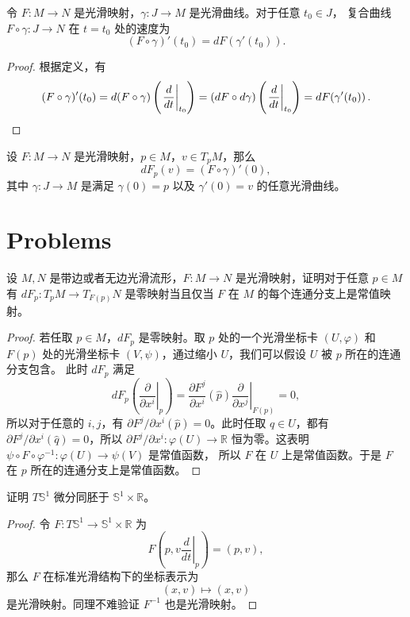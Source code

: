 \documentclass[fontset=none]{Notes}
\begin{document}
\begin{proposition}[复合曲线的速度]
  令 $F:M\to N$ 是光滑映射，$\gamma:J\to M$ 是光滑曲线。对于任意 $t_0\in J$，
  复合曲线 $F\circ\gamma:J\to N$ 在 $t=t_0$ 处的速度为
  \[
    (F\circ\gamma)'(t_0)=dF\!\left(\gamma'(t_0)\right)  .
  \]
\end{proposition}
\begin{proof}
  根据定义，有
  \[
    (F\circ\gamma)'(t_0)=d(F\circ\gamma)\left(
      \left.\frac{d}{dt}\right|_{t_0}
    \right)=(dF\circ d\gamma)\left(
      \left.\frac{d}{dt}\right|_{t_0}
    \right)=dF\!\left(\gamma'(t_0)\right).\qedhere
  \]
\end{proof}

\begin{corollary}[通过速度向量计算微分]
  设 $F:M\to N$ 是光滑映射，$p\in M$，$v\in T_pM$，那么
  \[
    dF_p(v)=(F\circ\gamma)'(0),  
  \]
  其中 $\gamma:J\to M$ 是满足 $\gamma(0)=p$ 以及 $\gamma'(0)=v$ 的任意光滑曲线。
\end{corollary}

\section{Problems}

\begin{problem}{}{}
  设 $M,N$ 是带边或者无边光滑流形，$F:M\to N$ 是光滑映射，证明对于任意 $p\in M$
  有 $dF_p:T_pM\to T_{F(p)}N$ 是零映射当且仅当 $F$ 在 $M$ 的每个连通分支上是常值映射。
\end{problem}
\begin{proof}
  若任取 $p\in M$，$dF_p$ 是零映射。取 $p$ 处的一个光滑坐标卡 $(U,\varphi)$ 和
  $F(p)$ 处的光滑坐标卡 $(V,\psi)$，通过缩小 $U$，我们可以假设 $U$ 被 $p$ 所在的连通分支包含。
  此时 $dF_p$ 满足
  \[
    dF_p\left(\left.\frac{\partial}{\partial x^i}\right|_p\right)=\frac{\partial F^j}{\partial x^i}(\hat p)
    \left.\frac{\partial}{\partial x^j}\right|_{F(p)}=0,
  \]
  所以对于任意的 $i,j$，有 $\partial F^j/\partial x^i(\hat p)=0$。此时任取 $q\in U$，都有
  $\partial F^j/\partial x^i(\hat q)=0$，所以 $\partial F^j/\partial x^i:\varphi(U)\to\mathbb{R}$
  恒为零。这表明 $\psi\circ F\circ\varphi^{-1}:\varphi(U)\to \psi(V)$ 是常值函数，
  所以 $F$ 在 $U$ 上是常值函数。于是 $F$ 在 $p$ 所在的连通分支上是常值函数。
\end{proof}

\begin{problem}{}{}
  证明 $T \mathbb{S}^1$ 微分同胚于 $\mathbb{S}^1\times \mathbb{R}$。
\end{problem}
\begin{proof}
  令 $F:T \mathbb{S}^1\to \mathbb{S}^1\times \mathbb{R}$ 为
  \[
    F\left(p, v\left.\frac{d}{dt}\right|_p\right)=(p,v),
  \]
  那么 $F$ 在标准光滑结构下的坐标表示为
  \[
    (x,v)\mapsto (x,v)
  \]
  是光滑映射。同理不难验证 $F^{-1}$ 也是光滑映射。
\end{proof}
\end{document}
